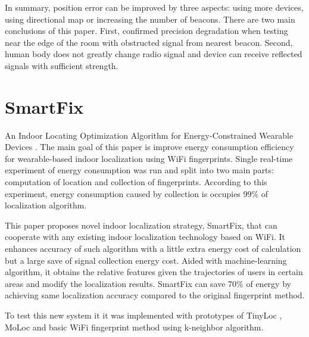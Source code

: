In summary, position error can be improved by three aspects: using more devices, using directional map or increasing the number of beacons. There are two main conclusions of this paper. First, confirmed precision degradation when testing near the edge of the room with obstructed signal from nearest beacon. Second, human body does not greatly change radio signal and device can receive reflected signals with sufficient strength. 

\section{SmartFix}\label{sec:SFILOAECWD}
An Indoor Locating Optimization Algorithm for Energy-Constrained Wearable Devices \cite{SmartFix}. The main goal of this paper is improve energy consumption efficiency for wearable-based indoor localization using WiFi fingerprints. Single real-time experiment of energy consumption was run and split into two main parts: computation of location and collection of fingerprints. According to this experiment, energy consumption caused by collection is occupies 99\% of localization algorithm.

This paper proposes novel indoor localization strategy, SmartFix, that can cooperate with any existing indoor localization technology based on WiFi. It enhances accuracy of such algorithm with a little extra energy cost of calculation but a large save of signal collection energy cost. Aided with machine-learning algorithm, it obtains the relative features given the trajectories of users in certain areas and modify the localization results. SmartFix can save 70\% of energy by achieving same localization accuracy compared to the original fingerprint method.

To test this new system it it was implemented with prototypes of TinyLoc \cite{TinyLoc}, MoLoc \cite{MoLoc} and basic WiFi fingerprint method using k-neighbor algorithm.